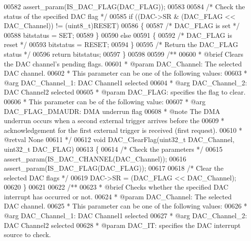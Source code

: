 \begin{DoxyCode}
00582   assert_param(IS\_DAC\_FLAG(DAC\_FLAG));
00583 
00584   \textcolor{comment}{/* Check the status of the specified DAC flag */}
00585   \textcolor{keywordflow}{if} ((DAC->SR & (DAC\_FLAG << DAC\_Channel)) != (uint8\_t)RESET)
00586   \{
00587     \textcolor{comment}{/* DAC\_FLAG is set */}
00588     bitstatus = SET;
00589   \}
00590   \textcolor{keywordflow}{else}
00591   \{
00592     \textcolor{comment}{/* DAC\_FLAG is reset */}
00593     bitstatus = RESET;
00594   \}
00595   \textcolor{comment}{/* Return the DAC\_FLAG status */}
00596   \textcolor{keywordflow}{return}  bitstatus;
00597 \}
00598 
00599 \textcolor{comment}{/**}
00600 \textcolor{comment}{  * @brief  Clears the DAC channel's pending flags.}
00601 \textcolor{comment}{  * @param  DAC\_Channel: The selected DAC channel. }
00602 \textcolor{comment}{  *          This parameter can be one of the following values:}
00603 \textcolor{comment}{  *            @arg DAC\_Channel\_1: DAC Channel1 selected}
00604 \textcolor{comment}{  *            @arg DAC\_Channel\_2: DAC Channel2 selected}
00605 \textcolor{comment}{  * @param  DAC\_FLAG: specifies the flag to clear. }
00606 \textcolor{comment}{  *          This parameter can be of the following value:}
00607 \textcolor{comment}{  *            @arg DAC\_FLAG\_DMAUDR: DMA underrun flag }
00608 \textcolor{comment}{  * @note   The DMA underrun occurs when a second external trigger arrives before the }
00609 \textcolor{comment}{  *         acknowledgement for the first external trigger is received (first request).               
                  }
00610 \textcolor{comment}{  * @retval None}
00611 \textcolor{comment}{  */}
00612 \textcolor{keywordtype}{void} DAC_ClearFlag(uint32\_t DAC\_Channel, uint32\_t DAC\_FLAG)
00613 \{
00614   \textcolor{comment}{/* Check the parameters */}
00615   assert_param(IS\_DAC\_CHANNEL(DAC\_Channel));
00616   assert_param(IS\_DAC\_FLAG(DAC\_FLAG));
00617 
00618   \textcolor{comment}{/* Clear the selected DAC flags */}
00619   DAC->SR = (DAC\_FLAG << DAC\_Channel);
00620 \}
00621 
00622 \textcolor{comment}{/**}
00623 \textcolor{comment}{  * @brief  Checks whether the specified DAC interrupt has occurred or not.}
00624 \textcolor{comment}{  * @param  DAC\_Channel: The selected DAC channel. }
00625 \textcolor{comment}{  *          This parameter can be one of the following values:}
00626 \textcolor{comment}{  *            @arg DAC\_Channel\_1: DAC Channel1 selected}
00627 \textcolor{comment}{  *            @arg DAC\_Channel\_2: DAC Channel2 selected}
00628 \textcolor{comment}{  * @param  DAC\_IT: specifies the DAC interrupt source to check. }

\end{DoxyCode}
